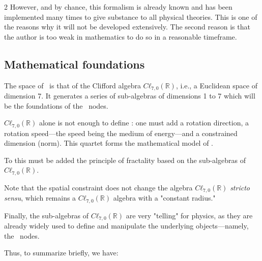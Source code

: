 \begin{multicols}{2}
	However, and by chance, this formalism is already known and has been implemented many times to give substance to all physical theories. This is one of the reasons why it will not be developed extensively. The second reason is that the author is too weak in mathematics to do so in a reasonable timeframe.
	
	\subsection{Mathematical foundations}
	
	The space of \PQ\ is that of the Clifford algebra $Cℓ_{7,0}(\mathbb{R})$, i.e., a Euclidean space of dimension 7. It generates a series of sub-algebras of dimensions 1 to 7 which will be the foundations of the \PQ\ nodes.
	
	$Cℓ_{7,0}(\mathbb{R})$ alone is not enough to define \PQ: one must add a rotation direction, a rotation speed—the speed being the medium of energy—and a constrained dimension (norm). This quartet forms the mathematical model of \PQ.
	
	To this must be added the principle of fractality based on the sub-algebras of $Cℓ_{7,0}(\mathbb{R})$.
	
	Note that the spatial constraint does not change the algebra $Cℓ_{7,0}(\mathbb{R})$ \textit{stricto sensu}, which remains a $Cℓ_{7,0}(\mathbb{R})$ algebra with a "constant radius."
	
	Finally, the sub-algebras of $Cℓ_{7,0}(\mathbb{R})$ are very "telling" for physics, as they are already widely used to define and manipulate the underlying objects—namely, the \PQ\ nodes.
	
	Thus, to summarize briefly, we have:
	
	\begin{center}
	\end{center}
	

\end{multicols}
